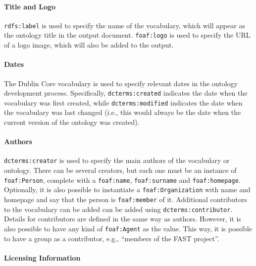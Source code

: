 \documentclass{article}
\begin{document}
\paragraph{Title and Logo} %
\label{par:title_and_logo}

\texttt{rdfs:label} is used to specify the name of the vocabulary, which will appear as the ontology title in the output document. \texttt{foaf:logo} is used to specify the URL of a logo image, which will also be added to the output.


\paragraph{Dates} %
\label{par:dates}

The Dublin Core vocabulary is used to specify relevant dates in the ontology development process. Specifically, \texttt{dcterms:created} indicates the date when the vocabulary was first created, while \texttt{dcterms:modified} indicates the date when the vocabulary was last changed (i.e., this would always be the date when the current version of the ontology was created).



\paragraph{Authors} %
\label{par:authors}

\texttt{dcterms:creator}  is used to specify the main authors of the vocabulary or ontology. There can be several creators, but each one must be an instance of \texttt{foaf:Person}, complete with a \texttt{foaf:name}, \texttt{foaf:surname} and \texttt{foaf:homepage}. Optionally, it is also possible to instantiate a \texttt{foaf:Organization} with name and homepage and say that the person is \texttt{foaf:member} of it. Additional  contributors to the vocabulary can be added can be added using \texttt{dcterms:contributor}. Details for contributors are defined in the same way as authors. However, it is also possible to have any kind of \texttt{foaf:Agent} as the value. This way, it is possible to have a group as a contributor, e.g., ``members of the FAST project''.


\paragraph{Licensing Information} %
\label{par:licensing_information}
\end{document}
